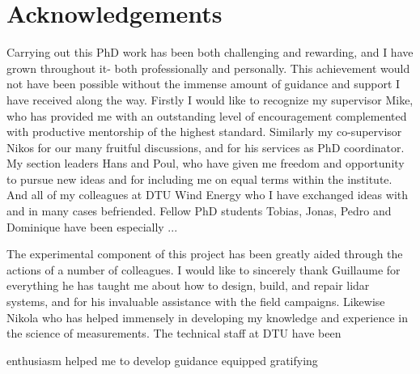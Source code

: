 \chapter{Acknowledgements}
\label{sec:acknowledgements}

Carrying out this PhD work has been both challenging and rewarding, and I have grown throughout it- both professionally and personally. This achievement would not have been possible without the immense amount of guidance and support I have received along the way. Firstly I would like to recognize my supervisor Mike, who has provided me with an outstanding level of encouragement complemented with productive mentorship of the highest standard. Similarly my co-supervisor Nikos for our many fruitful discussions, and for his services as PhD coordinator. My section leaders Hans and Poul, who have given me freedom and opportunity to pursue new ideas and for including me on equal terms within the institute. And all of my colleagues at DTU Wind Energy who I have exchanged ideas with and in many cases befriended. Fellow PhD students Tobias, Jonas, Pedro and Dominique have been especially ...

The experimental component of this project has been greatly aided through the actions of a number of colleagues. I would like to sincerely thank Guillaume for everything he has taught me about how to design, build, and repair lidar systems, and for his invaluable assistance with the field campaigns. Likewise Nikola who has helped immensely in developing my knowledge and experience in the science of measurements. The technical staff at DTU have been 

enthusiasm
helped me to develop 
guidance
equipped
gratifying

\begin{comment}
Technical staff (mainly Per, Steen, Hector)

Pierre Pinson

NCAR

TEM and MES
PhD office mates 
Tobi, Pedro, Dominique, Jonas, 
Tuhfe, Paul, Mark, Gregor, 

Mom & Dad, Rachael
Grandparents

Otto M{\o}nsted Fund
DTU Wind Energy (funding, etc)
Danish government and taxpayers

Wind industry
WISDOM and WFCT partners

Andrea Hahmann for WRF data

Examiners and paper reviewers
Charlotte for summary translation
Open source software developers and latex
\LaTeX
Antoine for thesis template
\end{comment}
